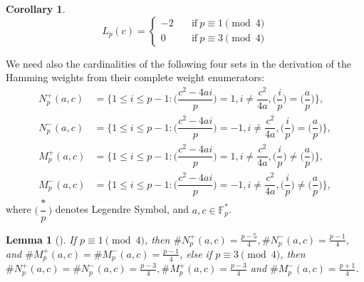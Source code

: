 \documentclass[final,1p,times]{elsarticle}
\newtheorem{sec3_cor2x}[sec3_cor1x]{Corollary}
\newtheorem{sec3_lemma2x}[sec3_lemma1x]{Lemma}
\begin{document}
  \begin{sec3_cor2x}\label{sec3_Legendre_symbol_Lpc}
  \begin{equation*}
        L_{p}(c)=
        \begin{cases}
        -2\quad &\text{if}\ p\equiv 1\pmod 4\\
        0\quad &\text{if}\ p\equiv 3\pmod 4
        \end{cases}
     \end{equation*}
  \end{sec3_cor2x}
  
  We need also the cardinalities of the following four sets in the derivation of the Hamming weights from their complete weight enumerators:
  \begin{align*}
  N_{p}^{+}(a,c)&=\biggl\lbrace 1\leq i\leq p-1:\biggl(\dfrac{c^{2}-4ai}{p}\biggr)=1,i\ne \dfrac{c^{2}}{4a},\biggl(\dfrac{i}{p}\biggr)=\biggl(\dfrac{a}{p}\biggr)\biggr\rbrace,\\
  N_{p}^{-}(a,c)&=\biggl\lbrace 1\leq i\leq p-1:\biggl(\dfrac{c^{2}-4ai}{p}\biggr)=-1,i\ne \dfrac{c^{2}}{4a},\biggl(\dfrac{i}{p}\biggr)=\biggl(\dfrac{a}{p}\biggr)\biggr\rbrace,\\
  M_{p}^{+}(a,c)&=\biggl\lbrace 1\leq i\leq p-1:\biggl(\dfrac{c^{2}-4ai}{p}\biggr)=1,i\ne \dfrac{c^{2}}{4a},\biggl(\dfrac{i}{p}\biggr)\ne\biggl(\dfrac{a}{p}\biggr)\biggr\rbrace,\\
    M_{p}^{-}(a,c)&=\biggl\lbrace 1\leq i\leq p-1:\biggl(\dfrac{c^{2}-4ai}{p}\biggr)=-1,i\ne \dfrac{c^{2}}{4a},\biggl(\dfrac{i}{p}\biggr)\ne\biggl(\dfrac{a}{p}\biggr)\biggr\rbrace,
  \end{align*}
  where $ \biggl(\dfrac{*}{p}\biggr)$ denotes Legendre Symbol, and $ a,c\in \mathbb{F}_{p}^{*} $.
  
  \begin{sec3_lemma2x}[\cite{Bib17}]\label{sec3_npac}
  If $ p\equiv 1\pmod 4 $, then $ \#N_{p}^{+}(a,c)=\frac{p-5}{4} , \#N_{p}^{-}(a,c)=\frac{p-1}{4} $, and $ \#M_{p}^{+}(a,c)=\#M_{p}^{-}(a,c)=\frac{p-1}{4} $, else if $ p\equiv 3\pmod 4 $, then $ \#N_{p}^{+}(a,c)=\#N_{p}^{-}(a,c)=\frac{p-3}{4} , \#M_{p}^{+}(a,c)=\frac{p-3}{4} $ and $ \#M_{p}^{-}(a,c)=\frac{p+1}{4} $. 
  \end{sec3_lemma2x}
   
\end{document}
